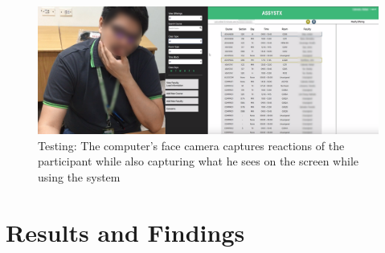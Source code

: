 \begin{figure}[]
\centering
   \includegraphics[scale=1.5,keepaspectratio]{PCSC2019_latex/Tests/sirTighe.png}
   \caption{Testing: The computer's face camera captures reactions of the participant while also capturing what he sees on the screen while using the system}
    \label{fig:cvc_testing}
\end{figure}

\section{Results and Findings}
